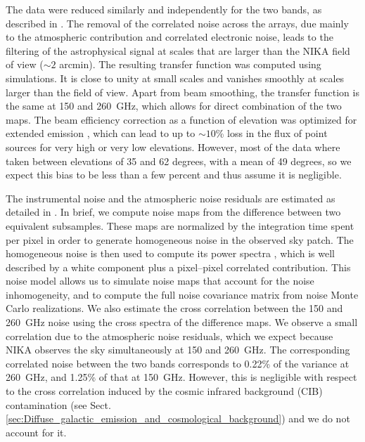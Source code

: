 \documentclass[twocolumn,traditabstract]{aa}
\begin{document}
The data were reduced similarly and independently for the two bands, as described in \cite{Adam2015}. The removal of the correlated noise across the arrays, due mainly to the atmospheric contribution and correlated electronic noise, leads to the filtering of the astrophysical signal at scales that are larger than the NIKA field of view ($\sim 2$ arcmin). The resulting transfer function was computed using simulations. It is close to unity at small scales and vanishes smoothly at scales larger than the field of view. Apart from beam smoothing, the transfer function is the same at 150 and 260~GHz, which allows for direct combination of the two maps. The beam efficiency correction as a function of elevation was optimized for extended emission \citep{Greve1998}, which can lead to up to $\sim 10$\% loss in the flux of point sources for very high or very low elevations. However, most of the data where taken between elevations of 35 and 62 degrees, with a mean of 49 degrees, so we expect this bias to be less than a few percent and thus assume it is negligible.

The instrumental noise and the atmospheric noise residuals are estimated as detailed in \cite{Adam2016}. In brief, we compute noise maps from the difference between two equivalent subsamples. These maps are normalized by the integration time spent per pixel in order to generate homogeneous noise in the observed sky patch. The homogeneous noise is then used to compute its power spectra \cite[using the POKER software,][]{Ponthieu2011}, which is well described by a white component plus a pixel--pixel correlated contribution. This noise model allows us to simulate noise maps that account for the noise inhomogeneity, and to compute the full noise covariance matrix from noise Monte Carlo realizations. We also estimate the cross correlation between the 150 and 260~GHz noise using the cross spectra of the difference maps. We observe a small correlation due to the atmospheric noise residuals, which we expect because NIKA observes the sky simultaneously at 150 and 260~GHz. The corresponding correlated noise between the two bands corresponds to 0.22\% of the variance at 260~GHz, and 1.25\% of that at 150~GHz. However, this is negligible with respect to the cross correlation induced by the cosmic infrared background (CIB) contamination (see Sect.~ \ref{sec:Diffuse_galactic_emission_and_cosmological_background}) and we do not account for it.

\end{document}
